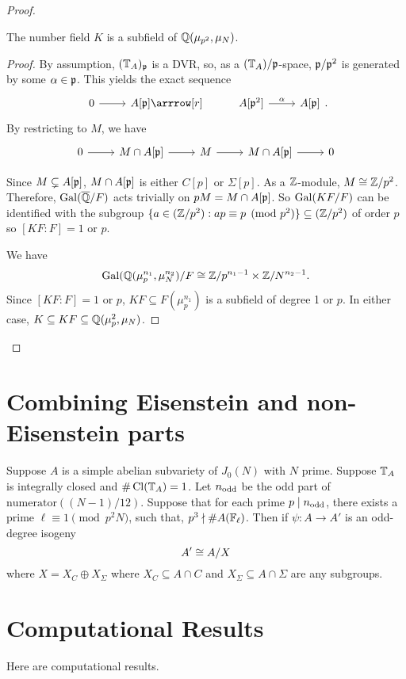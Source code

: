 \documentclass[thesis.tex]{subfiles}
\begin{document}
\begin{proof}
    \begin{lemma}
        The number field $K$ is a subfield of $\mathbb{Q}(\mu_{p^2}, \mu_N)$.
    \end{lemma}
    \begin{proof}
        By assumption, $(\mathbb{T}_A)_{\mathfrak{p}}$ is a DVR\@, so, as a $(\mathbb{T}_A)/\mathfrak{p}$-space,
        $\mathfrak{p}/\mathfrak{p}^2$ is generated by some $\alpha\in \mathfrak{p}$. This yields the exact
        sequence
        \[
            \begin{tikzcd}
                0 \arrow[r] &
                A[\p] \arrrow[r] &
                A[\p^2] \arrow[r, "\alpha"] &
                A[\p]
            \end{tikzcd}.
        \]
        By restricting to $M$, we have
        \begin{equation}
            \label{eq:M_Ap}
            \begin{tikzcd}
                0 \arrow[r] &
                M\cap A[\p] \arrow[r] &
                M \arrow[r] &
                M\cap A[\p] \arrow[r] &
                0
            \end{tikzcd} 
        \end{equation}

        Since $M\subsetneq A[\mathfrak{p}]$, $M\cap A[\mathfrak{p}]$ is either $C[p]$ or
        $\Sigma[p]$. As a $\mathbb{Z}$-module, $M\cong \mathbb{Z}/p^2$. Therefore,
        $\operatorname{Gal}(\overline{\mathbb{Q}}/F)$ acts trivially on $pM=M\cap A[\mathfrak{p}]$. So $\operatorname{Gal}(KF/F)$
        can be identified with the subgroup $\{a\in (\mathbb{Z}/p^2):ap\equiv p
        \pmod{p^2}\}\subseteq (\mathbb{Z}/p^2)$ of order $p$ so $[KF:F]=1$ or $p$.

        We have 
        \[
            \operatorname{Gal}(\mathbb{Q}(\mu_p ^{n_1}, \mu_N ^{n_2})/F \cong \mathbb{Z}/p^{n_1-1} \times
            \mathbb{Z}/N^{n_2-1}.
        \]
        Since $[KF:F]=1$ or $p$, $KF\subseteq F(\mu_p ^{n_1})$ is a subfield of
        degree 1 or $p$. In either case, $K\subseteq KF \subseteq \mathbb{Q}(\mu_p ^2,
        \mu_N)$.
    \end{proof}
\end{proof}


\section{Combining Eisenstein and non-Eisenstein parts}%
\label{sec:combining_eisenstein_and_non_eisenstein_parts}

\begin{theorem}
    Suppose $A$ is a simple abelian subvariety of $J_0(N)$ with $N$ prime.
    Suppose $\mathbb{T}_A$ is integrally closed and $\#\operatorname{Cl}(\mathbb{T}_A)=1$. Let $n_{\mathrm{odd}}$ be
    the odd part of $\mathrm{numerator}((N-1)/12)$. Suppose that for each prime
    $p\mid n_{\mathrm{odd}}$, there exists a prime $\ell\equiv 1 \pmod{p^2N}$, such that,
    $p^3\nmid \#A(\mathbb{F}_\ell)$. Then if $\psi:A\to A'$ is an odd-degree isogeny
    \[
        A'\cong A/X
    \]
    where $X=X_C\oplus X_\Sigma$ where $X_C\subseteq A\cap C$ and $X_\Sigma
    \subseteq A\cap \Sigma$ are any subgroups.
\end{theorem}

\section{Computational Results}

Here are computational results.
\end{document}
